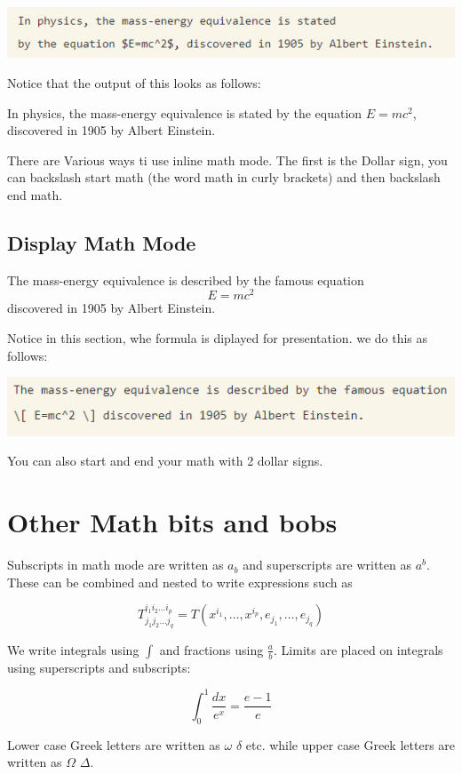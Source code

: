 \documentclass[12pt,a4paper,landscape]{article}
\begin{document}
\begin{flushleft}
\includegraphics{Inline Math Example.PNG}



Notice that the output of this looks as follows:

In physics, the mass-energy equivalence is stated 
by the equation $E=mc^2$, discovered in 1905 by Albert Einstein.

There are Various ways ti use inline math mode. The first is the Dollar sign, you can backslash start math (the word math in curly brackets) and then backslash end math. 
\subsection{Display Math Mode}

The mass-energy equivalence is described by the famous equation
\[ E=mc^2 \] discovered in 1905 by Albert Einstein. 

Notice in this section, whe formula is diplayed for presentation. we do this as follows:

\includegraphics{Display Math Mode Example.PNG}

You can also start and end your math with 2 dollar signs. 

\section{Other Math bits and bobs}
Subscripts in math mode are written as $a_b$ and superscripts are written as $a^b$. These can be combined and nested to write expressions such as

\[ T^{i_1 i_2 \dots i_p}_{j_1 j_2 \dots j_q} = T(x^{i_1},\dots,x^{i_p},e_{j_1},\dots,e_{j_q}) \]
 
We write integrals using $\int$ and fractions using $\frac{a}{b}$. Limits are placed on integrals using superscripts and subscripts:

\[ \int_0^1 \frac{dx}{e^x} =  \frac{e-1}{e} \]

Lower case Greek letters are written as $\omega$ $\delta$ etc. while upper case Greek letters are written as $\Omega$ $\Delta$.


\end{flushleft}
\end{document}
